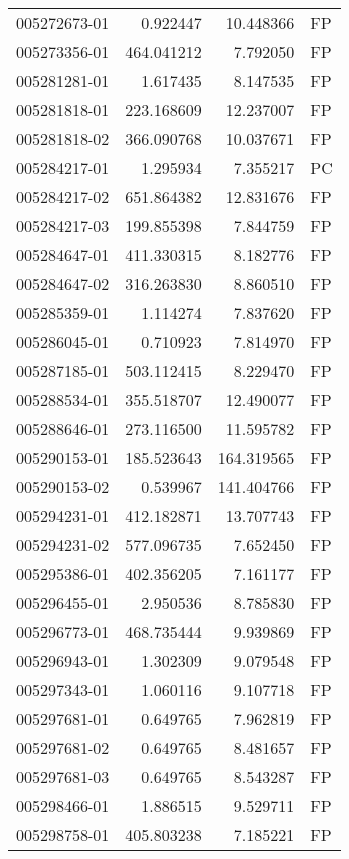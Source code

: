 \begin{tabular}{lrrl}
005272673-01 &    0.922447 &    10.448366 &   FP \\
005273356-01 &  464.041212 &     7.792050 &   FP \\
005281281-01 &    1.617435 &     8.147535 &   FP \\
005281818-01 &  223.168609 &    12.237007 &   FP \\
005281818-02 &  366.090768 &    10.037671 &   FP \\
005284217-01 &    1.295934 &     7.355217 &   PC \\
005284217-02 &  651.864382 &    12.831676 &   FP \\
005284217-03 &  199.855398 &     7.844759 &   FP \\
005284647-01 &  411.330315 &     8.182776 &   FP \\
005284647-02 &  316.263830 &     8.860510 &   FP \\
005285359-01 &    1.114274 &     7.837620 &   FP \\
005286045-01 &    0.710923 &     7.814970 &   FP \\
005287185-01 &  503.112415 &     8.229470 &   FP \\
005288534-01 &  355.518707 &    12.490077 &   FP \\
005288646-01 &  273.116500 &    11.595782 &   FP \\
005290153-01 &  185.523643 &   164.319565 &   FP \\
005290153-02 &    0.539967 &   141.404766 &   FP \\
005294231-01 &  412.182871 &    13.707743 &   FP \\
005294231-02 &  577.096735 &     7.652450 &   FP \\
005295386-01 &  402.356205 &     7.161177 &   FP \\
005296455-01 &    2.950536 &     8.785830 &   FP \\
005296773-01 &  468.735444 &     9.939869 &   FP \\
005296943-01 &    1.302309 &     9.079548 &   FP \\
005297343-01 &    1.060116 &     9.107718 &   FP \\
005297681-01 &    0.649765 &     7.962819 &   FP \\
005297681-02 &    0.649765 &     8.481657 &   FP \\
005297681-03 &    0.649765 &     8.543287 &   FP \\
005298466-01 &    1.886515 &     9.529711 &   FP \\
005298758-01 &  405.803238 &     7.185221 &   FP \\

\end{tabular}
